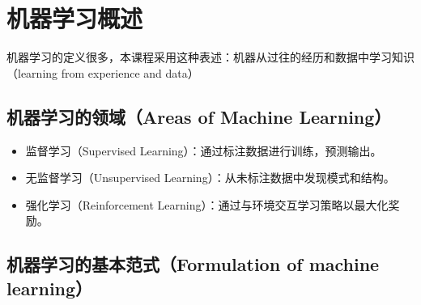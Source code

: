 \section{机器学习概述}

机器学习的定义很多，本课程采用这种表述：机器从过往的经历和数据中学习知识（learning from experience and data）

\subsection{机器学习的领域（Areas of Machine Learning）}

\begin{itemize}
    \item 监督学习（Supervised Learning）：通过标注数据进行训练，预测输出。
    \item 无监督学习（Unsupervised Learning）：从未标注数据中发现模式和结构。
    \item 强化学习（Reinforcement Learning）：通过与环境交互学习策略以最大化奖励。
\end{itemize}

\subsection{机器学习的基本范式（Formulation of machine learning）}

